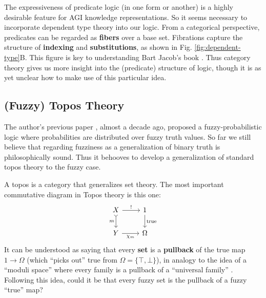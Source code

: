 \documentclass[orivec]{llncs}
\begin{document}
The expressiveness of predicate logic (in one form or another) is a highly desirable feature for AGI knowledge representations.  So it seems necessary to incorporate dependent type theory into our logic.  From a categorical perspective, predicates can be regarded as \textbf{fibers} over a base set.  Fibrations capture the structure of \textbf{indexing} and \textbf{substitutions}, as shown in Fig. \ref{fig:dependent-type}B.  This figure is key to understanding Bart Jacob's book \cite{Jacobs1999}.  Thus category theory gives us more insight into the (predicate) structure of logic, though it is as yet unclear how to make use of this particular idea.
%
%

\subsection{(Fuzzy) Topos Theory}

The author's previous paper \cite{Yan2012}, almost a decade ago, proposed a fuzzy-probabilistic logic where probabilities are distributed over fuzzy truth values.  So far we still believe that regarding fuzziness as a generalization of binary truth is philosophically sound.  Thus it behooves to develop a generalization of standard topos theory to the fuzzy case.  

A topos is a category that generalizes set theory.  The most important commutative diagram in Topos theory is this one:
\begin{equation}
\label{eqn:subobject-classifier}
\begin{tikzcd}[column sep = normal]
X \arrow[r, "!"] \arrow[d, tail, swap, "m"] & 1 \arrow[d, "\mathrm{true}"] \\
Y \arrow[r, swap, "\chi_m"] & \Omega
\end{tikzcd}
\end{equation}
It can be understood as saying that every \textbf{set} is a \textbf{pullback} of the true map $1 \rightarrow \Omega$ (which ``picks out'' true from $\Omega = \{ \top, \bot \}$), in analogy to the idea of a ``moduli space'' where every family is a pullback of a ``universal family'' \cite{Schlichenmaier2010} \cite{Harris2006}.  Following this idea, could it be that every fuzzy set is the pullback of a fuzzy ``true'' map?  
\end{document}
